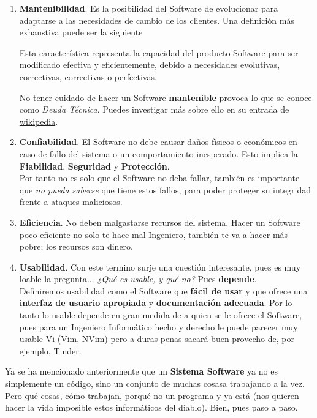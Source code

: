 \begin{enumerate}
    \item \textbf{Mantenibilidad}. Es la posibilidad del Software de evolucionar para adaptarse a las necesidades
    de cambio de los clientes. Una definición más exhaustiva puede ser la siguiente
    \begin{enfasis}
        Esta característica representa la capacidad del producto Software para ser modificado efectiva y
        eficientemente, debido a necesidades evolutivas, correctivas, correctivas o perfectivas.
    \end{enfasis}
    No tener cuidado de hacer un Software \textbf{mantenible} provoca lo que se conoce como \textit{Deuda Técnica}.
    Puedes investigar más sobre ello en su entrada de \href{https://es.wikipedia.org/wiki/Deuda_t%C3%A9cnica}{wikipedia}.
    \item \textbf{Confiabilidad}. El Software no debe causar daños físicos o económicos en caso de fallo del sistema
     o un comportamiento inesperado. Esto implica la \textbf{Fiabilidad}, \textbf{Seguridad} y \textbf{Protección}. \\
     Por tanto no es solo que el Software no deba fallar, también es importante que \textit{no pueda saberse} que
     tiene estos fallos, para poder proteger su integridad frente a ataques maliciosos.
     \item \textbf{Eficiencia}. No deben malgastarse recursos del sistema. Hacer un Software poco eficiente no solo
     te hace mal Ingeniero, también te va a hacer más pobre; los recursos son dinero.
     \item \textbf{Usabilidad}. Con este termino surje una cuestión interesante, pues es muy loable la pregunta...
     \textit{¿Qué es usable, y qué no?} Pues \textbf{depende}. \\
     Definiremos usabilidad como el Software que \textbf{fácil de usar} y que ofrece una \textbf{interfaz de usuario
     apropiada} y \textbf{documentación adecuada}. Por lo tanto lo usable depende en gran medida de a quien se le 
     ofrece el Software, pues para un Ingeniero Informático hecho y derecho le puede parecer muy usable Vi 
     (Vim, NVim) pero a duras penas sacará buen provecho de, por ejemplo, Tinder.
\end{enumerate}

\newpage

Ya se ha mencionado anteriormente que un \textbf{Sistema Software} ya no es simplemente un código, sino un conjunto
de muchas cosasa trabajando a la vez. Pero qué cosas, cómo trabajan, porqué no un programa y ya está (nos quieren
hacer la vida imposible estos informáticos del diablo). Bien, pues paso a paso.

